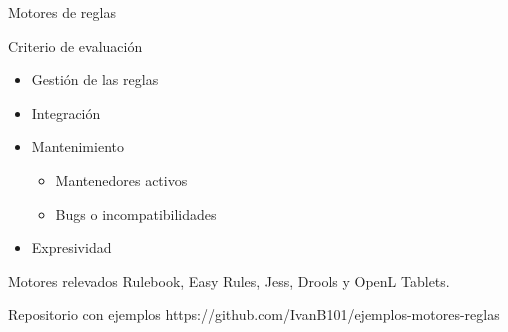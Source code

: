 \documentclass[10pt]{beamer}
\begin{document}
\begin{frame}{Motores de reglas}
    \begin{block}{Criterio de evaluación}
        \begin{itemize}
            \item Gestión de las reglas
            \item Integración
            \item Mantenimiento
            \begin{itemize}
                \item Mantenedores activos
                \item Bugs o incompatibilidades
            \end{itemize}
            \item Expresividad
        \end{itemize}    
    \end{block}
    \begin{block}{Motores relevados}
        Rulebook, Easy Rules, Jess, Drools y OpenL Tablets.
    \end{block}
    \begin{block}{Repositorio con ejemplos}
        https://github.com/IvanB101/ejemplos-motores-reglas
    \end{block}
\end{frame}
\end{document}

